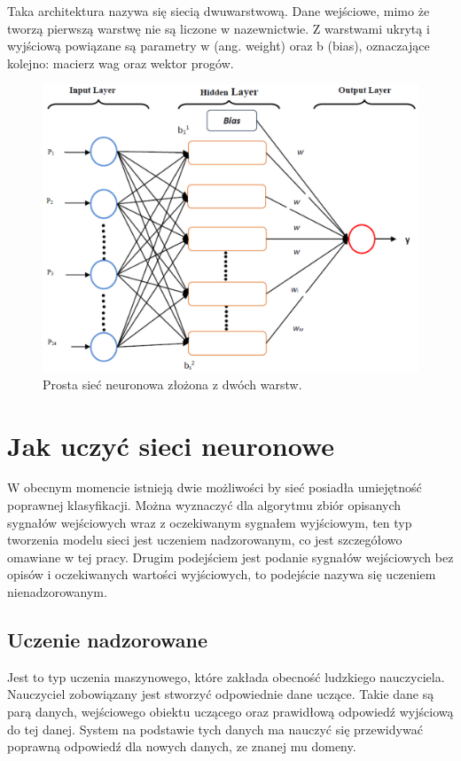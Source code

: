 \documentclass[12pt,a4paper,twoside,titlepage,openright]{book}
\begin{document}
Taka architektura nazywa się siecią dwuwarstwową. Dane wejściowe, mimo że tworzą pierwszą warstwę nie są liczone w nazewnictwie.
Z warstwami ukrytą i wyjściową powiązane są parametry w (ang. weight) oraz b (bias), oznaczające kolejno: macierz wag oraz wektor progów.

\begin{figure}[h]
	\centering
			\includegraphics[resolution=100]{SiecNeuronowa.png}
		\caption{Prosta sieć neuronowa złożona z dwóch warstw.}
\end{figure}

\section{Jak uczyć sieci neuronowe}
W obecnym momencie istnieją dwie możliwości by sieć posiadła umiejętność poprawnej klasyfikacji. Można wyznaczyć dla algorytmu zbiór opisanych sygnałów wejściowych wraz z oczekiwanym sygnałem wyjściowym, ten typ tworzenia modelu sieci jest uczeniem nadzorowanym, co jest szczegółowo omawiane w tej pracy. Drugim podejściem jest podanie sygnałów wejściowych bez opisów i oczekiwanych wartości wyjściowych, to podejście nazywa się uczeniem nienadzorowanym.

\subsection*{Uczenie nadzorowane}
Jest to typ uczenia maszynowego, które zakłada obecność ludzkiego nauczyciela. Nauczyciel zobowiązany jest stworzyć odpowiednie dane uczące. Takie dane są parą danych, wejściowego obiektu uczącego oraz prawidłową odpowiedź wyjściową do tej danej. System na podstawie tych danych ma nauczyć się przewidywać poprawną odpowiedź dla nowych danych, ze znanej mu domeny.
\end{document}
